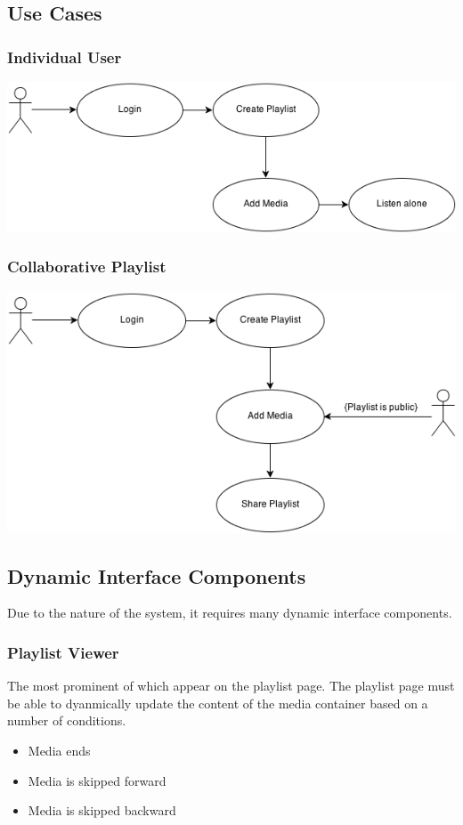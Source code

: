 \documentclass{sig-alt-release2}
\begin{document}
\subsection{Use Cases}
\subsubsection{Individual User}
\includegraphics[scale=0.3]{img/uc_listenalone}
\subsubsection{Collaborative Playlist}
\includegraphics[scale=0.3]{img/uc_share}

\subsection{Dynamic Interface Components}
Due to the nature of the system, it requires many dynamic interface components. 

\subsubsection{Playlist Viewer}
The most prominent of which appear on the playlist page. The playlist page must be able to dyanmically update the content of the media container based on a number of conditions.
\begin{itemize}
\item Media ends
\item Media is skipped forward
\item Media is skipped backward
\end{itemize}
\end{document}
